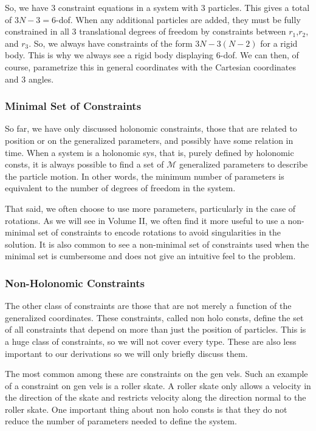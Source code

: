 \documentclass[10pt, openany, titlepage]{book}
\theoremstyle{definition}
\newcounter{example}[chapter]
\begin{document}
So, we have 3 constraint equations in a system with 3 particles. This gives a total of $3N-3=6$-\gls{dof}. When any additional particles are added, they must be fully constrained in all 3 translational degrees of freedom by constraints between $r_1$,$r_2$, and $r_3$. So, we always have constraints of the form $3N-3(N-2)$ for a \gls{rigid body}. This is why we always see a \gls{rigid body} displaying 6-\gls{dof}. We can then, of course, parametrize this in general coordinates with the Cartesian coordinates and 3 angles.

\subsubsection{Minimal Set of Constraints}

So far, we have only discussed holonomic constraints, those that are related to position or on the generalized parameters, and possibly have some relation in time. When a system is a \gls{holonomic sys}, that is, purely defined by \glspl{holonomic const}, it is always possible to find a set of $\mathcal{M}$ generalized parameters to describe the particle motion. In other words, the minimum number of parameters is equivalent to the number of degrees of freedom in the system.

That said, we often choose to use more parameters, particularly in the case of rotations. As we will see in Volume II, we often find it more useful to use a non-minimal set of constraints to encode rotations to avoid singularities in the solution. It is also common to see a non-minimal set of constraints used when the minimal set is cumbersome and does not give an intuitive feel to the problem.
\subsubsection{Non-Holonomic Constraints}

The other class of constraints are those that are not merely a function of the \glspl{generalized coordinate}. These constraints, called \glspl{non holo const}, define the set of all constraints that depend on more than just the position of particles. This is a huge class of constraints, so we will not cover every type. These are also less important to our derivations so we will only briefly discuss them.

The most common among these are constraints on the \glspl{gen vel}.  Such an example of a constraint on \glspl{gen vel} is a roller skate. A roller skate only allows a velocity in the direction of the skate and restricts velocity along the direction normal to the roller skate. One important thing about \glspl{non holo const} is that they do not reduce the number of parameters needed to define the system. 
\end{document}

